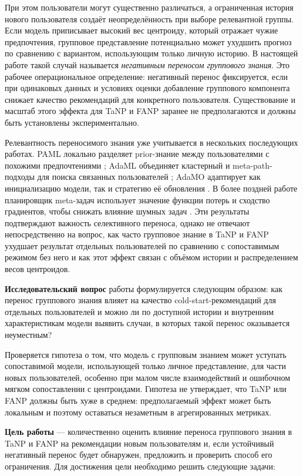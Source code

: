 \documentclass[12pt,a4paper]{article}
\begin{document}
При этом пользователи могут существенно различаться, а ограниченная история
нового пользователя создаёт неопределённость при выборе релевантной группы.
Если модель приписывает высокий вес центроиду, который отражает чужие
предпочтения, групповое представление потенциально может ухудшить прогноз по
сравнению с вариантом, использующим только личную историю. В настоящей работе
такой случай называется \emph{негативным переносом группового знания}. Это
рабочее операциональное определение: негативный перенос фиксируется, если при
одинаковых данных и условиях оценки добавление группового компонента снижает
качество рекомендаций для конкретного пользователя. Существование и масштаб
этого эффекта для TaNP и FANP заранее не предполагаются и должны быть
установлены экспериментально.

Релевантность переносимого знания уже учитывается в нескольких последующих
работах. PAML локально разделяет prior-знание между пользователями с похожими
предпочтениями \citep{wang2021paml}; AdaML объединяет кластерный и
meta-path-подходы для поиска связанных пользователей \citep{xu2023adaml};
AdaMO адаптирует как инициализацию модели, так и стратегию её обновления
\citep{adamo2024}. В более поздней работе планировщик meta-задач использует
значение функции потерь и сходство градиентов, чтобы снижать влияние шумных
задач \citep{dualmeta2025}. Эти результаты подтверждают важность селективного
переноса, однако не отвечают непосредственно на вопрос, как часто групповое
знание в TaNP и FANP ухудшает результат отдельных пользователей по сравнению
с сопоставимым режимом без него и как этот эффект связан с объёмом истории и
распределением весов центроидов.

\textbf{Исследовательский вопрос} работы формулируется следующим образом:
как перенос группового знания влияет на качество cold-start-рекомендаций для
отдельных пользователей и можно ли по доступной истории и внутренним
характеристикам модели выявить случаи, в которых такой перенос оказывается
неуместным?

Проверяется гипотеза о том, что модель с групповым знанием может уступать
сопоставимой модели, использующей только личное представление, для части новых
пользователей, особенно при малом числе взаимодействий и ошибочном мягком
сопоставлении с центроидами. Гипотеза не утверждает, что TaNP или FANP должны
быть хуже в среднем: предполагаемый эффект может быть локальным и поэтому
оставаться незаметным в агрегированных метриках.

\textbf{Цель работы} --- количественно оценить влияние переноса группового
знания в TaNP и FANP на рекомендации новым пользователям и, если устойчивый
негативный перенос будет обнаружен, предложить и проверить способ его
ограничения. Для достижения цели необходимо решить следующие задачи:
\end{document}
